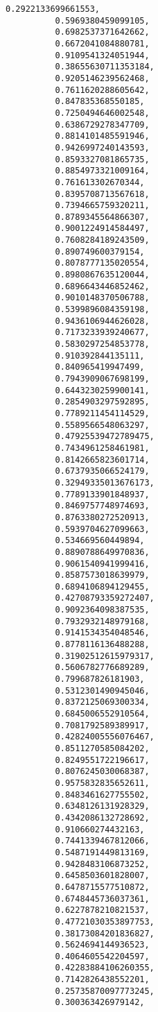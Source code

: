 \documentclass[11pt]{article}
\begin{document}
\begin{Verbatim}[commandchars=\\\{\}]
          0.2922133699661553,
          0.5969380459099105,
          0.6982537371642662,
          0.6672041084880781,
          0.9109541324051944,
          0.38655630711353184,
          0.9205146239562468,
          0.7611620288605642,
          0.847835368550185,
          0.7250494646002548,
          0.6386729278347709,
          0.8814101485591946,
          0.9426997240143593,
          0.8593327081865735,
          0.8854973321009164,
          0.761613302670344,
          0.8395708713567618,
          0.7394665759320211,
          0.8789345564866307,
          0.9001224914584497,
          0.7608284189243509,
          0.890749600379154,
          0.8078777135020554,
          0.8980867635120044,
          0.6896643446852462,
          0.9010148370506788,
          0.5399896084359198,
          0.9436106944626028,
          0.7173233939240677,
          0.5830297254853778,
          0.910392844135111,
          0.840965419947499,
          0.7943909067698199,
          0.6443230259900141,
          0.2854903297592895,
          0.7789211454114529,
          0.5589566548063297,
          0.47925539472789475,
          0.7434961258461981,
          0.8142665823601714,
          0.6737935066524179,
          0.32949335013676173,
          0.7789133901848937,
          0.8469757748974693,
          0.8763380272520913,
          0.5939704627099663,
          0.534669560449894,
          0.8890788649970836,
          0.9061540941999416,
          0.8587573018639979,
          0.6894106894129455,
          0.42708793359272407,
          0.9092364098387535,
          0.7932932148979168,
          0.9141534354048546,
          0.8778116136488288,
          0.31902512615979317,
          0.5606782776689289,
          0.799687826181903,
          0.5312301490945046,
          0.8372125069300334,
          0.6845006552910564,
          0.7081792589389917,
          0.42824005556076467,
          0.8511270585084202,
          0.8249551722196617,
          0.8076245030068387,
          0.9575832835652611,
          0.8483461627755502,
          0.6348126131928329,
          0.4342086132728692,
          0.910660274432163,
          0.7441339467812066,
          0.5487191449813169,
          0.9428483106873252,
          0.6458503601828007,
          0.6478715577510872,
          0.6748445736037361,
          0.6227878210821537,
          0.47721030353897753,
          0.38173084201836827,
          0.5624694144936523,
          0.4064605542204597,
          0.42283884106260355,
          0.7142826438552201,
          0.25735870097773245,
          0.300363426979142,

\end{Verbatim}
\end{document}
